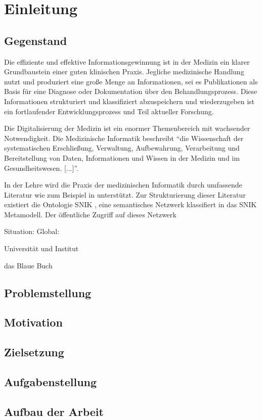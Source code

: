 \chapter{Einleitung}\label{ch:introduction}
\section{Gegenstand}
Die effiziente und effektive Informationsgewinnung ist in der Medizin ein klarer Grundbaustein einer guten klinischen Praxis. Jegliche medizinische Handlung nutzt und produziert eine große Menge an Informationen, sei es Publikationen als Basis für eine Diagnose oder Dokumentation über den Behandlungsprozess. Diese Informationen strukturiert und klassifiziert abzuspeichern und wiederzugeben ist ein fortlaufender Entwicklungsprozess und Teil aktueller Forschung.

Die Digitalisierung der Medizin ist ein enormer Themenbereich mit wachsender Notwendigkeit. Die Medizinische Informatik beschreibt  \enquote{die Wissenschaft der systematischen Erschließung, Verwaltung, Aufbewahrung, Verarbeitung und Bereitstellung von Daten, Informationen und Wissen in der Medizin und im Gesundheitswesen. [...]}\citep{gmds}.

In der Lehre wird die Praxis der medizinischen Informatik durch umfassende Literatur wie zum Beispiel in \citet{bb} unterstützt. Zur Strukturierung dieser Literatur existiert die Ontologie SNIK \citep{snikgraphposter}, eine semantisches Netzwerk klassifiert in das SNIK Metamodell. Der öffentliche Zugriff auf dieses Netzwerk 


Situation:
Global:

Universität und Institut

das Blaue Buch
\section{Problemstellung}


\section{Motivation}

\section{Zielsetzung}\label{sec:zielsetzung}


\section{Aufgabenstellung}

\section{Aufbau der Arbeit}
